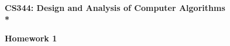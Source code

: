\documentclass{article}
\begin{document}
\begin{center}
\bf{\LARGE CS344: Design and Analysis of Computer Algorithms} \\*

\vspace{0.2in}
{\bf {\Large Homework 1}}
\end{center}

\vspace{.2in}


\vspace{.2in}
\end{document}
